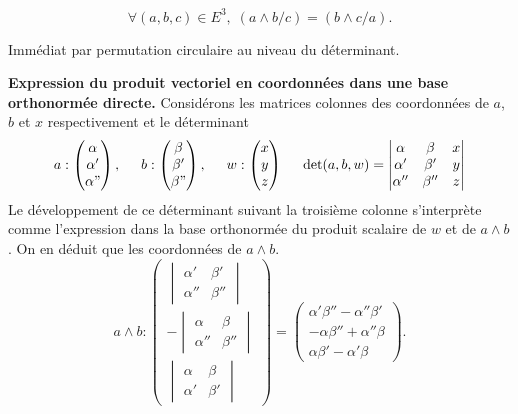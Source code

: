 \begin{propn}[Tournicoter]
\[
 \forall (a,b,c) \in E^3, \; (a\wedge b / c) = (b\wedge c /a).
\]
\end{propn}
\begin{demo}
 Immédiat par permutation circulaire au niveau du déterminant.
\end{demo}

\textbf{Expression du produit vectoriel en coordonnées dans une base orthonormée directe.}\newline
Considérons les matrices colonnes des coordonnées de $a$, $b$ et $x$ respectivement et le déterminant
\[
 a: \begin{pmatrix}
     \alpha \\ \alpha' \\ \alpha"
    \end{pmatrix}, \hspace{0.5cm}
 b: \begin{pmatrix}
     \beta \\ \beta' \\ \beta"
    \end{pmatrix}, \hspace{0.5cm}
 w: \begin{pmatrix}
     x \\ y \\ z
    \end{pmatrix} \hspace{0.5cm}
\det(a,b,w) = 
\begin{vmatrix}
 \alpha & \beta & x \\
 \alpha' & \beta' & y \\
 \alpha'' & \beta'' & z
\end{vmatrix}
\]
Le développement de ce déterminant suivant la troisième colonne s'interprète comme l'expression dans la base orthonormée du produit scalaire de $w$ et de $a\wedge b$. On en déduit que les coordonnées de $a\wedge b$.
\[
 a\wedge b : 
 \begin{pmatrix}
  \begin{vmatrix}
   \alpha' & \beta' \\ \alpha'' & \beta''
  \end{vmatrix}\\
  -\begin{vmatrix}
   \alpha & \beta \\ \alpha'' & \beta ''
  \end{vmatrix} \\
  \begin{vmatrix}
   \alpha & \beta \\ \alpha' & \beta'
  \end{vmatrix}
 \end{pmatrix}
 =
 \begin{pmatrix}
  \alpha' \beta'' -\alpha'' \beta' \\ -\alpha \beta'' + \alpha'' \beta \\ \alpha \beta' - \alpha' \beta
 \end{pmatrix}
.
\]

